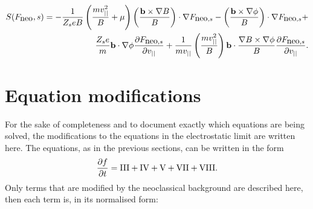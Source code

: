 \begin{eqnarray}
S(F_{\mbox{neo}},s) = -\frac{1}{Z_{s}eB}\left(\frac{mv_{||}^{2}}{B}+\mu\right)\left(\frac{{\bf b}\times\nabla B}{B}\right)\cdot \nabla F_{\mbox{neo},s} -\left(\frac{{\bf b}\times\nabla \phi}{B}\right)\cdot\nabla F_{\mbox{neo},s}+ \nonumber\\ \frac{Z_{s}e}{m}{\bf b}\cdot\nabla\phi \frac{\partial F_{\mbox{neo},s}}{\partial v_{||}} + \frac{1}{mv_{||}}\left(\frac{mv_{||}^{2}}{B}\right){\bf b}\cdot\frac{\nabla B\times\nabla\phi}{B} \frac{\partial F_{\mbox{neo},s}}{\partial v_{||}}.
\end{eqnarray}

\section{Equation modifications}

For the sake of completeness and to document exactly
which equations are being solved, the modifications to the equations in the electrostatic limit are written here.
The equations, as in the previous sections, can be written in the form 
\begin{equation}
\label{eqs:neoclassics-complete-set}
{\partial f \over \partial t} = {\rm III} + {\rm IV} + {\rm V} + {\rm VII}+ {\rm VIII}.
\end{equation}
Only terms that are modified by the
neoclassical background are described here, then each term is, in its normalised form:

